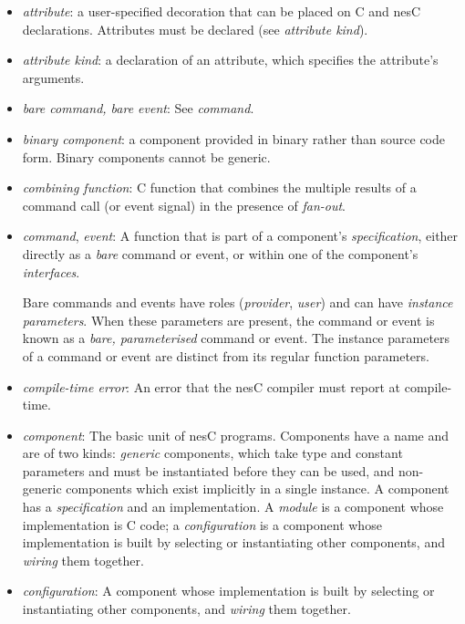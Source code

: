 \documentclass[11pt,letterpaper]{article}
\newcommand{\nesc}{nesC\xspace}
\begin{document}
\begin{itemize}
\item \emph{attribute}: a user-specified decoration that can be placed on C
and nesC declarations. Attributes must be declared (see \emph{attribute
kind}).

\item \emph{attribute kind}: a declaration of an attribute, which
specifies the attribute's arguments.

\item \emph{bare command, bare event}: See \emph{command}.

\item \emph{binary component}: a component provided in binary rather than
source code form. Binary components cannot be generic.

\item \emph{combining function}: C function that combines the multiple
results of a command call (or event signal) in the presence of
\emph{fan-out}.

\item \emph{command}, \emph{event}: A function that is part of a
component's \emph{specification}, either directly as a \emph{bare}
command or event, or within one of the component's \emph{interfaces}.

Bare commands and events have roles (\emph{provider}, \emph{user}) and can
have \emph{instance parameters}. When these parameters are present, the
command or event is known as a \emph{bare, parameterised} command or
event. The instance parameters of a command or event are distinct from its
regular function parameters.

\item \emph{compile-time error}: An error that the \nesc compiler must
report at compile-time.

\item \emph{component}: The basic unit of \nesc programs. Components have a
name and are of two kinds: \emph{generic} components, which take type and
constant parameters and must be instantiated before they can be used, and
non-generic components which exist implicitly in a single instance. A
component has a \emph{specification} and an implementation. A \emph{module}
is a component whose implementation is C code; a \emph{configuration} is a
component whose implementation is built by selecting or instantiating other
components, and \emph{wiring} them together.

\item \emph{configuration}: A component whose implementation is built by
selecting or instantiating other components, and \emph{wiring} them
together.


\end{itemize}
\end{document}
